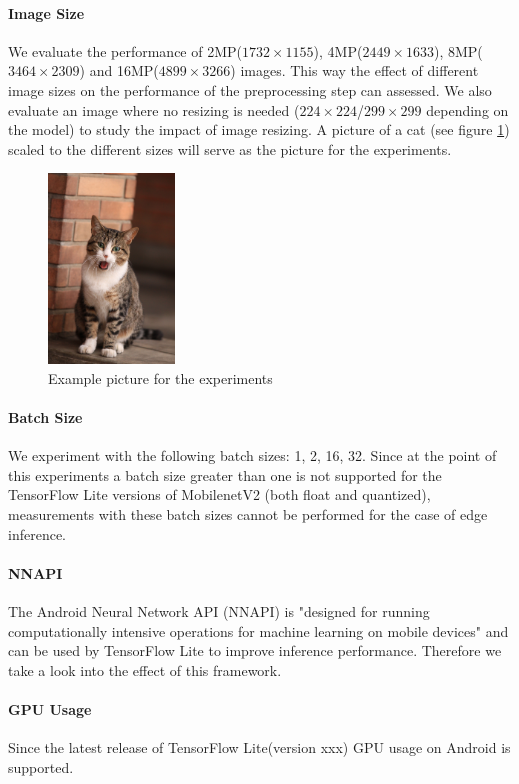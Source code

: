 \paragraph{Image Size}
We evaluate the performance of 2MP($1732\times1155$), 4MP($2449\times1633$), 8MP($3464\times2309$) and 16MP($4899\times3266$) images. This way the effect of different image sizes on the performance of the preprocessing step can assessed. We also evaluate an image where no resizing is needed ($224\times224$/$299\times299$ depending on the model) to study the impact of image resizing. A picture of a cat (see figure \ref{fig:cat}) scaled to the different sizes will serve as the picture for the experiments.
\begin{figure}[H]
\centering
\includegraphics[width=0.3\textwidth]{./Bilder/European_cat_02_16_mp.jpg}
\caption{Example picture for the experiments \cite{cat}}
\label{fig:cat}
\end{figure}
\paragraph{Batch Size}
We experiment with the following batch sizes: 1, 2, 16, 32. Since at the point of this experiments a batch size greater than one is not supported for the TensorFlow Lite versions of MobilenetV2 (both float and quantized), measurements with these batch sizes cannot be performed for the case of edge inference.
\paragraph{NNAPI}
The Android Neural Network API (NNAPI)
is "designed for running computationally intensive operations for machine learning on mobile devices" \cite{NNAPI} and can be used by TensorFlow Lite to improve inference performance. Therefore we take a look into the effect of this framework.
\paragraph{GPU Usage}
Since the latest release of TensorFlow Lite(version xxx) GPU usage on Android is supported. 
